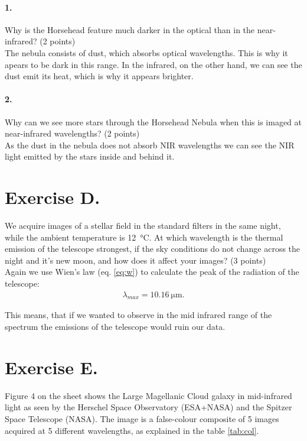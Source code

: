 \documentclass[11pt,a4paper,twoside]{article}
\begin{document}
\paragraph{1.} Why is the Horsehead feature much darker in the optical than in
the near-infrared? (2 points)  \\

The nebula consists of dust, which absorbs optical wavelengths. This is why it
apears to be dark in this range.
In the infrared, on the other hand, we can see the dust emit its heat, which is
why it appears brighter. 

\paragraph{2.} Why can we see more stars through the Horsehead Nebula when this
is imaged at near-infrared wavelengths? (2 points) \\

As the dust in the nebula does not absorb NIR wavelengths we can see the NIR 
light emitted by the stars inside and behind it.




\section*{Exercise D.}

We acquire images of a stellar field in the standard filters in the same night,
while the ambient temperature is \SI{12}{\celsius}. At which wavelength
is the thermal emission of the telescope strongest, if the sky conditions do
not change across the night and it's new moon, and how does it affect your
images? (3 points) \\

Again we use Wien's law (eq. \ref{eq:w}) to calculate the peak of the
radiation of the telescope:
\begin{align}
\lambda_{max} = \SI{10.16}{\micro\meter}.
\end{align}

This means, that if we wanted to observe in the mid infrared range of the
spectrum the emissions of the telescope would ruin our data.


\section*{Exercise E.}

Figure 4 on the sheet shows the Large Magellanic Cloud galaxy in mid-infrared
light as seen by the Herschel Space Observatory (ESA+NASA) and the Spitzer
Space Telescope (NASA). The image is a false-colour composite of 5 images
acquired at 5 different wavelengths, as explained in the table \ref{tab:col}.
\end{document}
